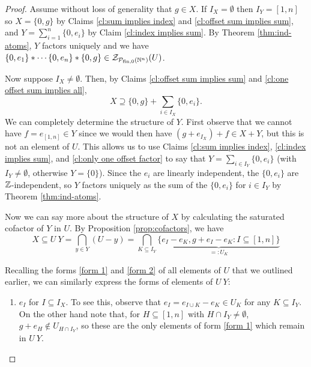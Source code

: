 \begin{proof}
	Assume without loss of generality that $g\in X$.
	If $I_X = \emptyset$ then $I_Y = [1,n]$ so $X = \{0,g\}$ by Claims \ref{cl:sum implies index} and \ref{cl:offset sum implies sum}, and $Y = \sum_{i=1}^n \{0,e_i\}$ by Claim \ref{cl:index implies sum}.
	By Theorem \ref{thm:ind-atoms}, $Y$ factors uniquely and we have $\{0,e_1\}*\cdots \{0,e_n\}*\{0,g\}\in \mathcal{Z}_{\mathcal{P}_{\textrm{fin}, 0}(\mathbb{N}^n)}(U)$.
	
	Now suppose $I_X \neq \emptyset$.
	Then, by Claims \ref{cl:offset sum implies sum} and \ref{cl:one offset sum implies all}, 
	\[X \supseteq \{0,g\} + \sum_{i\in I_X} \{0,e_i\}. \tag{1} \label{factor-includes} \]
	We can completely determine the structure of $Y$.
	First observe that we cannot have $f=e_{[1,n]}\in Y$ since we would then have $(g+e_{I_X})+f \in X+Y$, but this is not an element of $U$.
	This allows us to use Claims \ref{cl:sum implies index}, \ref{cl:index implies sum}, and \ref{cl:only one offset factor} to say that $Y = \sum_{i\in I_Y} \{0,e_i\}$ (with $I_Y\neq\emptyset$, otherwise $Y=\{0\}$).
	Since the $e_i$ are linearly independent, the $\{0,e_i\}$ are $\mathbb{Z}$-independent, so $Y$ factors uniquely as the sum of the $\{0,e_i\}$ for $i\in I_Y$ by Theorem \ref{thm:ind-atoms}.
	
	Now we can say more about the structure of $X$ by calculating the saturated cofactor of $Y$ in $U$.
	By Proposition \ref{prop:cofactors}, we have 
	\[X \subseteq U\:Y = \bigcap_{y\in Y}(U-y) = \bigcap_{K\subseteq I_Y} \underbrace{\{e_I - e_K, g+e_I - e_K : I\subseteq [ 1,n ] \}}_{=:U_K} \tag{2} \label{Y cofactor}\]
	
	Recalling the forms \ref{form 1} and \ref{form 2} of all elements of $U$ that we outlined earlier, we can similarly express the forms of elements of $U\:Y$:
	\begin{enumerate}[label={\rm ({\small F\arabic{*}}$'$)}]
		\item $e_I$ for $I\subseteq I_X$. \label{form 1'}
		To see this, observe that $e_I = e_{I\cup K}-e_K\in U_K$ for any $K\subseteq I_Y$.
		On the other hand note that, for $H \subseteq [ 1,n ]$ with $H\cap I_Y\neq \emptyset$, $g+e_H\notin U_{H\cap I_Y}$, so these are the only elements of form \ref{form 1} which remain in $U\:Y$.


\end{enumerate}
\end{proof}
